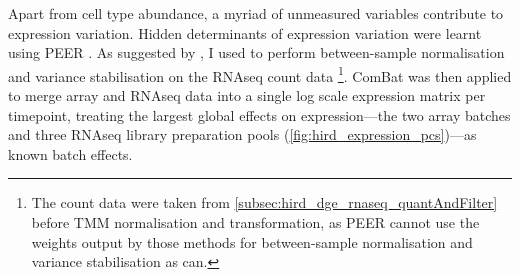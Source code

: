 %
%
Apart from cell type abundance, a myriad of unmeasured variables contribute to expression variation.
Hidden determinants of expression variation were learnt using {PEER} \autocite{stegle2012UsingProbabilisticEstimation}.
As suggested by \textcite{stegle2012UsingProbabilisticEstimation}, I used  \autocite{love2014ModeratedEstimationFold} to perform between-sample normalisation and variance stabilisation on the \gls{RNAseq} count data%
\footnote{
    The count data were taken from \cref{subsec:hird_dge_rnaseq_quantAndFilter} before \gls{TMM} normalisation and  transformation,
    as PEER cannot use the weights output by those methods for between-sample normalisation and variance stabilisation as  can.
}.
ComBat \autocite{johnson2007AdjustingBatchEffects} was then applied to merge array and \gls{RNAseq} data into a single log scale expression matrix per timepoint, treating the largest global effects on expression---the two array batches and three \gls{RNAseq} library preparation pools (\cref{fig:hird_expression_pcs})---as known batch effects.
